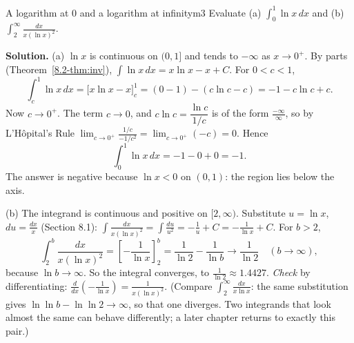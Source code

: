 \documentclass[11pt]{article}
\begin{document}
\begin{exmp}{A logarithm at $0$ and a logarithm at infinity}{m3}
Evaluate (a) $\displaystyle\int_0^1\ln x\,dx$ and (b) $\displaystyle\int_2^\infty\frac{dx}{x(\ln x)^2}$.

\textbf{Solution.} (a) $\ln x$ is continuous on $(0,1]$ and tends to $-\infty$ as $x\to0^+$. By parts (Theorem~\ref{8.2-thm:inv}), $\int\ln x\,dx=x\ln x-x+C$. For $0<c<1$,
\[\int_c^1\ln x\,dx=\big[x\ln x-x\big]_c^1=(0-1)-(c\ln c-c)=-1-c\ln c+c .\]
Now $c\to0^+$. The term $c\to0$, and $c\ln c=\dfrac{\ln c}{1/c}$ is of the form $\frac{-\infty}\infty$, so by L'Hôpital's Rule $\lim_{c\to0^+}\frac{1/c}{-1/c^2}=\lim_{c\to0^+}(-c)=0$. Hence
\[\int_0^1\ln x\,dx=-1-0+0=-1 .\]
The answer is negative because $\ln x<0$ on $(0,1)$: the region lies below the axis.

(b) The integrand is continuous and positive on $[2,\infty)$. Substitute $u=\ln x$, $du=\frac{dx}x$ (Section 8.1): $\int\frac{dx}{x(\ln x)^2}=\int\frac{du}{u^2}=-\frac1u+C=-\frac1{\ln x}+C$. For $b>2$,
\[\int_2^b\frac{dx}{x(\ln x)^2}=\left[-\frac1{\ln x}\right]_2^b=\frac1{\ln2}-\frac1{\ln b}\longrightarrow\frac1{\ln2}\quad(b\to\infty),\]
because $\ln b\to\infty$. So the integral converges, to $\frac1{\ln2}\approx1.4427$. \emph{Check} by differentiating: $\frac d{dx}\left(-\frac1{\ln x}\right)=\frac1{x(\ln x)^2}$.
(Compare $\int_2^\infty\frac{dx}{x\ln x}$: the same substitution gives $\ln\ln b-\ln\ln2\to\infty$, so that one diverges. Two integrands that look almost the same can behave differently; a later chapter returns to exactly this pair.)
\end{exmp}
\end{document}
